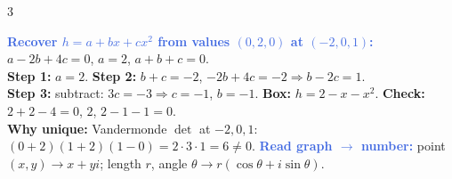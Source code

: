 \documentclass[9pt]{extarticle}
\newcommand{\hl}[1]{\textbf{\textcolor{BrickRed}{#1}}}
\newcommand{\wk}[1]{\textbf{\textcolor{OliveGreen}{#1}}}
\newcommand{\ex}[1]{\textbf{\textcolor{RoyalBlue}{#1}}}
\begin{document}
\begin{multicols}{3}
\begin{center}
\end{center}
\begin{sloppypar}\raggedright
\ex{Recover $h{=}a{+}bx{+}cx^2$ from values $(0,2,0)$ at $({-}2,0,1)$:} $a{-}2b{+}4c{=}0$, $a{=}2$, $a{+}b{+}c{=}0$.\\
\wk{Step 1:} $a{=}2$. \wk{Step 2:} $b{+}c{=}{-}2$, ${-}2b{+}4c{=}{-}2\Rightarrow b{-}2c{=}1$.\\
\wk{Step 3:} subtract: $3c{=}{-}3\Rightarrow c{=}{-}1$, $b{=}{-}1$. \hl{Box:} \hl{$h{=}2{-}x{-}x^2$}. \wk{Check:} $2{+}2{-}4{=}0$, $2$, $2{-}1{-}1{=}0$.\\
\wk{Why unique:} Vandermonde $\det$ at ${-}2,0,1$: $(0{+}2)(1{+}2)(1{-}0){=}2{\cdot}3{\cdot}1{=}6{\ne}0$.
\ex{Read graph $\to$ number:} point $(x,y)\to x{+}yi$; length $r$, angle $\theta\to r(\cos\theta{+}i\sin\theta)$.
\end{sloppypar}

\end{multicols}
\end{document}
